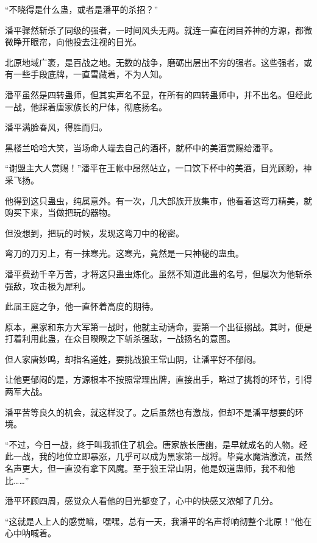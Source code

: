 \begin{this_body}
“不晓得是什么蛊，或者是潘平的杀招？”

潘平骤然斩杀了同级的强者，一时间风头无两。就连一直在闭目养神的方源，都微微睁开眼帘，向他投去注视的目光。

北原地域广袤，是百战之地。无数的战争，磨砺出层出不穷的强者。这些强者，或有一些手段底牌，一直雪藏着，不为人知。

潘平虽然是四转蛊师，但其实声名不显，在所有的四转蛊师中，并不出名。但经此一战，他踩着唐家族长的尸体，彻底扬名。

潘平满脸春风，得胜而归。

黑楼兰哈哈大笑，当场命人端去自己的酒杯，就杯中的美酒赏赐给潘平。

“谢盟主大人赏赐！”潘平在王帐中昂然站立，一口饮下杯中的美酒，目光顾盼，神采飞扬。

他得到这只蛊虫，纯属意外。有一次，几大部族开放集市，他看着这弯刀精美，就购买下来，当做把玩的器物。

但没想到，把玩的时候，发现这弯刀中的秘密。

弯刀的刀刃上，有一抹寒光。这寒光，竟然是一只神秘的蛊虫。

潘平费劲千辛万苦，才将这只蛊虫炼化。虽然不知道此蛊的名号，但屡次为他斩杀强敌，攻击极为犀利。

此届王庭之争，他一直怀着高度的期待。

原本，黑家和东方大军第一战时，他就主动请命，要第一个出征搦战。其时，便是打着利用此蛊，在众目睽睽之下斩杀强敌，一战扬名的意图。

但人家唐妙鸣，却指名道姓，要挑战狼王常山阴，让潘平好不郁闷。

让他更郁闷的是，方源根本不按照常理出牌，直接出手，略过了挑将的环节，引得两军大战。

潘平苦等良久的机会，就这样没了。之后虽然也有激战，但却不是潘平想要的环境。

“不过，今日一战，终于叫我抓住了机会。唐家族长唐幽，是早就成名的人物。经此一战，我的地位立即暴涨，几乎可以成为黑家第一战将。毕竟水魔浩激流，虽然名声更大，但一直没有拿下风魔。至于狼王常山阴，他是奴道蛊师，我不和他比……”

潘平环顾四周，感觉众人看他的目光都变了，心中的快感又浓郁了几分。

“这就是人上人的感觉嘛，嘿嘿，总有一天，我潘平的名声将响彻整个北原！”他在心中呐喊着。

\end{this_body}

